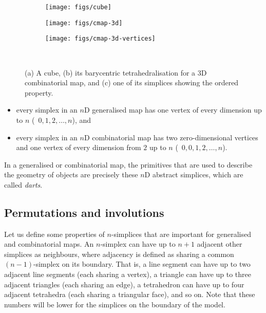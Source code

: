 \begin{figure}
\centering
\begin{subfigure}{0.33\linewidth}
\texttt{[image: figs/cube]}
\caption{}%
\label{subfig:cube}
\end{subfigure}%
\begin{subfigure}{0.33\linewidth}
\texttt{[image: figs/cmap-3d]}
\caption{}%
\label{subfig:cmap-3d}
\end{subfigure}%
\begin{subfigure}{0.33\linewidth}
\texttt{[image: figs/cmap-3d-vertices]}
\caption{}%
\label{subfig:cmap-3d-vertices}
\end{subfigure}\\
\caption{(a) A cube, (b) its barycentric tetrahedralisation for a 3D combinatorial map, and (c) one of its simplices showing the ordered property.}%
\label{fig:cmap-3d}
\end{figure}

\begin{itemize}
\item every simplex in an \(n\)D generalised map has one vertex of every dimension up to \(n\) (\ie\ \(0, 1, 2, \ldots, n\)), and
\item every simplex in an \(n\)D combinatorial map has two zero-dimensional vertices and one vertex of every dimension from \(2\) up to \(n\) (\ie\ \(0, 0, 1, 2, \ldots, n\)).
\end{itemize}

In a generalised or combinatorial map, the primitives that are used to describe the geometry of objects are precisely these \(n\)D abstract simplices, which are called \emph{darts}.

\subsection{Permutations and involutions}

Let us define some properties of \(n\)-simplices that are important for generalised and combinatorial maps.
An \(n\)-simplex can have up to \(n+1\) adjacent other simplices as neighbours, where adjacency is defined as sharing a common \((n-1)\)-simplex on its boundary.
That is, a line segment can have up to two adjacent line segments (each sharing a vertex), a triangle can have up to three adjacent triangles (each sharing an edge), a tetrahedron can have up to four adjacent tetrahedra (each sharing a triangular face), and so on.
Note that these numbers will be lower for the simplices on the boundary of the model.

